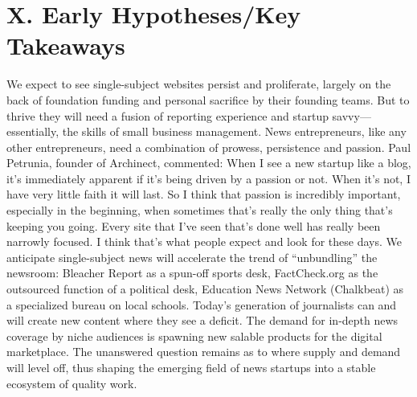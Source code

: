 \chapter{X. Early Hypotheses/Key Takeaways}
We expect to see single-subject websites persist and proliferate, largely
on the back of foundation funding and personal sacrifice by their founding
teams. But to thrive they will need a fusion of reporting experience and
startup savvy—essentially, the skills of small business management. News
entrepreneurs, like any other entrepreneurs, need a combination of prowess,
persistence and passion. Paul Petrunia, founder of Archinect, commented:
When I see a new startup like a blog, it’s immediately apparent if it’s
being driven by a passion or not. When it’s not, I have very little faith
it will last. So I think that passion is incredibly important, especially
in the beginning, when sometimes that’s really the only thing that’s
keeping you going. Every site that I’ve seen that’s done well has really
been narrowly focused. I think that’s what people expect and look for
these days.
We anticipate single-subject news will accelerate the trend of ``unbundling''
the newsroom: Bleacher Report as a spun-off sports desk, FactCheck.org
as the outsourced function of a political desk, Education News Network
(Chalkbeat) as a specialized bureau on local schools.
Today’s generation of journalists can and will create new content where they
see a deficit. The demand for in-depth news coverage by niche audiences is
spawning new salable products for the digital marketplace. The unanswered
question remains as to where supply and demand will level off, thus shaping
the emerging field of news startups into a stable ecosystem of quality work.